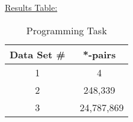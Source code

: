 \documentclass[12pt,letterpaper,final]{report}
\begin{document}
\underline{Results Table:}

\begin{table}[H]
    \centering
    \begin{tabular}{|c|c|}
    \hline
    Data Set \# & *-pairs \\
    \hline
    1 & 4 \\
    \hline
    2 & 248,339 \\
    \hline
    3 & \ 24,787,869 \\
    \hline
    \end{tabular}
    \caption{Programming Task}
    \label{tab:my_table}
\end{table}
\bigskip





\bigskip

\bigskip
















\end{document}
